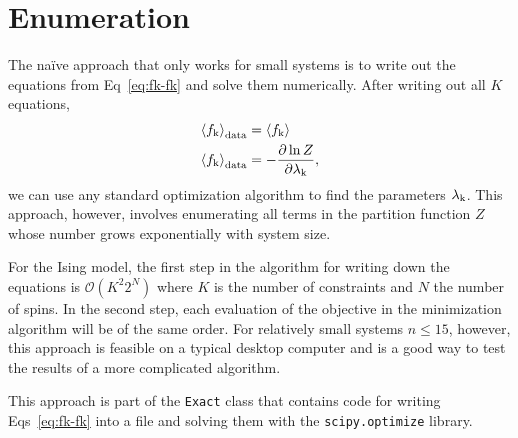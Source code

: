 \documentclass[aps,prl,twocolumn,nofootinbib]{revtex4-1}
\begin{document}


\section{Enumeration}
The na\"{i}ve approach that only works for small systems is to write out the equations from Eq~\ref{eq:fk-fk} and solve them numerically. After writing out all $K$ equations,
\begin{align}
	\left<f_{\rm k}\right>_{\rm data} &= \left<f_{\rm k}\right>\\
	\left<f_{\rm k}\right>_{\rm data} &= -\frac{\partial \ln Z}{\partial \lambda_{\rm k}},
\end{align}
we can use any standard optimization algorithm to find the parameters $\lambda_{\rm k}$. 
This approach, however, involves enumerating all terms in the partition function $Z$ whose number grows exponentially with system size. 

For the Ising model, the first step in the algorithm for writing down the equations is $\mathcal{O}(K^2 2^{N})$ where $K$ is the number of constraints and $N$ the number of spins. In the second step, each evaluation of the objective in the minimization algorithm will be of the same order. For relatively small systems $n\leq15$, however, this approach is feasible on a typical desktop computer and is a good way to test the results of a more complicated algorithm.

This approach is part of the {\tt Exact} class that contains code for writing Eqs~\ref{eq:fk-fk} into a file and solving them with the {\tt scipy.optimize} library.
\end{document}
